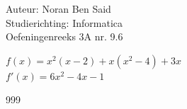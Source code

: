 \documentclass[a4paper]{article}
\begin{document}
  
\noindent \large Auteur: Noran Ben Said \\
\noindent \large Studierichting: Informatica\\
\noindent \large Oefeningenreeks 3A nr. 9.6\\

\medskip

\normalsize
$f(x) = x^2(x-2)+x(x^2-4)+3x$\\

$f'(x) = 6x^2-4x-1$\\

\begin{thebibliography}{999}
\end{thebibliography}
\end{document}
